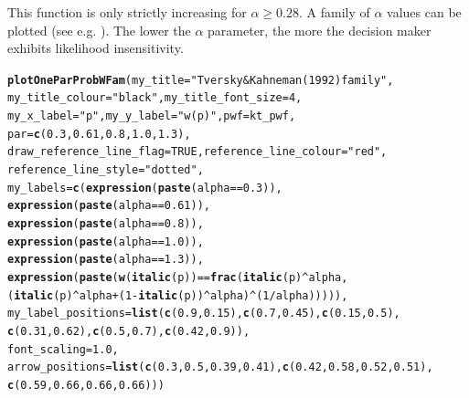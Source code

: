 \documentclass{article}\usepackage[]{graphicx}\usepackage[]{color}
\makeatletter
\newcommand{\hlnum}[1]{\textcolor[rgb]{0.686,0.059,0.569}{#1}}%
\newcommand{\hlstr}[1]{\textcolor[rgb]{0.192,0.494,0.8}{#1}}%
\newcommand{\hlopt}[1]{\textcolor[rgb]{0,0,0}{#1}}%
\newcommand{\hlstd}[1]{\textcolor[rgb]{0.345,0.345,0.345}{#1}}%
\newcommand{\hlkwc}[1]{\textcolor[rgb]{0.333,0.667,0.333}{#1}}%
\newcommand{\hlkwd}[1]{\textcolor[rgb]{0.737,0.353,0.396}{\textbf{#1}}}%
\newenvironment{kframe}{%
 \def\at@end@of@kframe{}%
 \ifinner\ifhmode%
  \def\at@end@of@kframe{\end{minipage}}%
  \begin{minipage}{\columnwidth}%
 \fi\fi%
 \def\FrameCommand##1{\hskip\@totalleftmargin \hskip-\fboxsep
 \colorbox{shadecolor}{##1}\hskip-\fboxsep
     \hskip-\linewidth \hskip-\@totalleftmargin \hskip\columnwidth}%
 \MakeFramed {\advance\hsize-\width
   \@totalleftmargin\z@ \linewidth\hsize
   \@setminipage}}%
 {\par\unskip\endMakeFramed%
 \at@end@of@kframe}
\newenvironment{knitrout}{}{} %
\makeatother
\begin{document}
This function is only strictly increasing for $\alpha \geq 0.28$. A family of
$\alpha$ values can be plotted (see e.g. \cite[][p. 207 Figure 7.2.1]{Wakker_2010}). The lower the $\alpha$ parameter, the more the decision maker exhibits likelihood insensitivity.

\begin{knitrout}
\color{fgcolor}\begin{kframe}
\begin{alltt}
\hlkwd{plotOneParProbWFam}\hlstd{(}\hlkwc{my_title}\hlstd{=}\hlstr{"Tversky & Kahneman (1992) family"}\hlstd{,}
        \hlkwc{my_title_colour}\hlstd{=}\hlstr{"black"}\hlstd{,} \hlkwc{my_title_font_size}\hlstd{=}\hlnum{4}\hlstd{,}
        \hlkwc{my_x_label} \hlstd{=} \hlstr{"p"}\hlstd{,} \hlkwc{my_y_label} \hlstd{=} \hlstr{"w(p)"}\hlstd{,} \hlkwc{pwf}\hlstd{=kt_pwf,}
        \hlkwc{par}\hlstd{=}\hlkwd{c}\hlstd{(}\hlnum{0.3}\hlstd{,} \hlnum{0.61}\hlstd{,} \hlnum{0.8}\hlstd{,} \hlnum{1.0}\hlstd{,} \hlnum{1.3}\hlstd{),}
        \hlkwc{draw_reference_line_flag}\hlstd{=}\hlnum{TRUE}\hlstd{,} \hlkwc{reference_line_colour}\hlstd{=}\hlstr{"red"}\hlstd{,}
        \hlkwc{reference_line_style}\hlstd{=}\hlstr{"dotted"}\hlstd{,}
        \hlkwc{my_labels}\hlstd{=}\hlkwd{c}\hlstd{(}\hlkwd{expression}\hlstd{(}\hlkwd{paste}\hlstd{(alpha} \hlopt{==} \hlnum{0.3}\hlstd{)),}
        \hlkwd{expression}\hlstd{(}\hlkwd{paste}\hlstd{(alpha} \hlopt{==} \hlnum{0.61}\hlstd{)),}
        \hlkwd{expression}\hlstd{(}\hlkwd{paste}\hlstd{(alpha} \hlopt{==} \hlnum{0.8}\hlstd{)),}
        \hlkwd{expression}\hlstd{(}\hlkwd{paste}\hlstd{(alpha} \hlopt{==} \hlnum{1.0}\hlstd{)),}
        \hlkwd{expression}\hlstd{(}\hlkwd{paste}\hlstd{(alpha} \hlopt{==} \hlnum{1.3}\hlstd{)),}
        \hlkwd{expression}\hlstd{(}\hlkwd{paste}\hlstd{(}\hlkwd{w}\hlstd{(}\hlkwd{italic}\hlstd{(p))} \hlopt{==} \hlkwd{frac}\hlstd{(}\hlkwd{italic}\hlstd{(p)}\hlopt{^}\hlstd{alpha,}
        \hlstd{(}\hlkwd{italic}\hlstd{(p)}\hlopt{^}\hlstd{alpha} \hlopt{+} \hlstd{(}\hlnum{1}\hlopt{-}\hlkwd{italic}\hlstd{(p))}\hlopt{^}\hlstd{alpha)}\hlopt{^}\hlstd{(}\hlnum{1}\hlopt{/}\hlstd{alpha))))),}
        \hlkwc{my_label_positions}\hlstd{=}\hlkwd{list}\hlstd{(}\hlkwd{c}\hlstd{(}\hlnum{0.9}\hlstd{,}\hlnum{0.15}\hlstd{),}\hlkwd{c}\hlstd{(}\hlnum{0.7}\hlstd{,}\hlnum{0.45}\hlstd{),}\hlkwd{c}\hlstd{(}\hlnum{0.15}\hlstd{,}\hlnum{0.5}\hlstd{),}
        \hlkwd{c}\hlstd{(}\hlnum{0.31}\hlstd{,}\hlnum{0.62}\hlstd{),}\hlkwd{c}\hlstd{(}\hlnum{0.5}\hlstd{,}\hlnum{0.7}\hlstd{),}\hlkwd{c}\hlstd{(}\hlnum{0.42}\hlstd{,} \hlnum{0.9}\hlstd{)),}
        \hlkwc{font_scaling}\hlstd{=}\hlnum{1.0}\hlstd{,}
        \hlkwc{arrow_positions} \hlstd{=} \hlkwd{list}\hlstd{(}\hlkwd{c}\hlstd{(}\hlnum{0.3}\hlstd{,}\hlnum{0.5}\hlstd{,}\hlnum{0.39}\hlstd{,}\hlnum{0.41}\hlstd{),}\hlkwd{c}\hlstd{(}\hlnum{0.42}\hlstd{,}\hlnum{0.58}\hlstd{,}\hlnum{0.52}\hlstd{,}\hlnum{0.51}\hlstd{),}
                \hlkwd{c}\hlstd{(}\hlnum{0.59}\hlstd{,}\hlnum{0.66}\hlstd{,}\hlnum{0.66}\hlstd{,}\hlnum{0.66}\hlstd{)))}
\end{alltt}
\end{kframe}


\end{knitrout}
\end{document}
